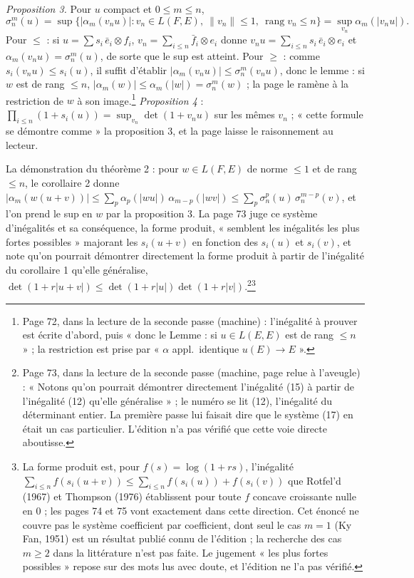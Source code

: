 \documentclass[11pt,a4paper]{article}
\begin{document}
\emph{Proposition 3.} Pour $u$ compact et $0 \leq m \leq n$,
\[
  \sigma_n^m(u) = \sup\bigl\{ |\alpha_m(v_n u)| : v_n \in L(F,E),\ \|v_n\| \leq 1,\   \operatorname{rang} v_n \leq n \bigr\} = \sup_{v_n} \alpha_m(|v_n u|) .
\]
Pour $\leq$ : si $u = \sum s_i\,\bar{e}_i \otimes f_i$, $v_n = \sum_{i \leq n}
\bar{f}_i \otimes e_i$ donne $v_n u = \sum_{i \leq n} s_i\,\bar{e}_i \otimes
e_i$ et $\alpha_m(v_n u) = \sigma_n^m(u)$, de sorte que le sup est atteint.
Pour $\geq$ : comme $s_i(v_n u) \leq s_i(u)$, il suffit d'établir
$|\alpha_m(v_n u)| \leq \sigma_n^m(v_n u)$, donc le lemme : si $w$ est de
rang $\leq n$, $|\alpha_m(w)| \leq \alpha_m(|w|) = \sigma_n^m(w)$ ; la page
le ramène à la restriction de $w$ à son image.\footnote{Page 72, dans la
lecture de la seconde passe (machine) : l'inégalité à prouver est écrite
d'abord, puis « donc le Lemme : si $u \in L(E,E)$ est de rang $\leq n$ » ; la
restriction est prise par « $\alpha$ appl.\ identique $u(E) \to E$ ».}
\emph{Proposition 4} : $\prod_{i \leq n}(1 + s_i(u)) = \sup_{v_n}
\det(1 + v_n u)$ sur les mêmes $v_n$ ; « cette formule se démontre comme »
la proposition 3, et la page laisse le raisonnement au lecteur.

La démonstration du théorème 2 : pour $w \in L(F,E)$ de norme $\leq 1$ et de
rang $\leq n$, le corollaire 2 donne $|\alpha_m(w(u+v))| \leq
\sum_p \alpha_p(|wu|)\,\alpha_{m-p}(|wv|) \leq \sum_p \sigma_n^p(u)\,
\sigma_n^{m-p}(v)$, et l'on prend le sup en $w$ par la proposition 3. La page
73 juge ce système d'inégalités et sa conséquence, la forme produit,
« semblent les inégalités les plus fortes possibles » majorant les $s_i(u+v)$ en
fonction des $s_i(u)$ et $s_i(v)$, et note qu'on pourrait démontrer
directement la forme produit à partir de l'inégalité du corollaire 1
qu'elle généralise, $\det(1 + r|u+v|) \leq \det(1 + r|u|)\det(1 +
r|v|)$.\footnote{Page 73, dans la lecture de la seconde passe (machine, page
relue à l'aveugle) : « Notons qu'on pourrait démontrer directement
l'inégalité (15) à partir de l'inégalité (12) qu'elle généralise » ; le
numéro se lit (12), l'inégalité du déterminant entier. La première passe lui
faisait dire que le système (17) en était un cas particulier. L'édition n'a
pas vérifié que cette voie directe aboutisse.}\footnote{La forme produit
est, pour $f(s) = \log(1 + rs)$, l'inégalité $\sum_{i \leq n} f(s_i(u+v)) \leq
\sum_{i \leq n} f(s_i(u)) + f(s_i(v))$ que Rotfel'd (1967) et Thompson (1976)
établissent pour toute $f$ concave croissante nulle en $0$ ; les pages 74
et 75 vont exactement dans cette direction. Cet énoncé ne couvre pas le
système coefficient par coefficient, dont seul le cas $m = 1$ (Ky Fan, 1951)
est un résultat publié connu de l'édition ; la recherche des cas $m \geq 2$
dans la littérature n'est pas faite. Le jugement « les plus fortes
possibles » repose sur des mots lus avec doute, et l'édition ne l'a pas
vérifié.}
\end{document}
